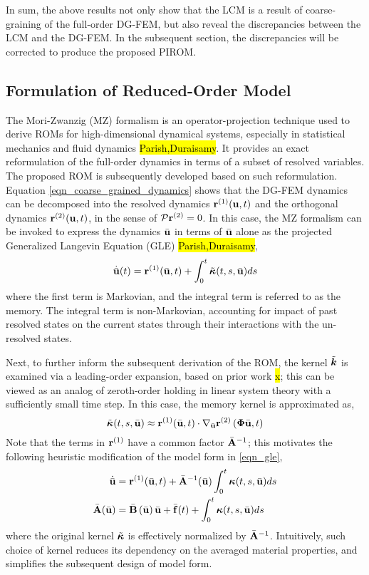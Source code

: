 In sum, the above results not only show that the LCM is a result of coarse-graining of the full-order DG-FEM, but also reveal the discrepancies between the LCM and the DG-FEM. In the subsequent section, the discrepancies will be corrected to produce the proposed PIROM.

\subsection{Formulation of Reduced-Order Model}

The Mori-Zwanzig (MZ) formalism is an operator-projection technique used to derive ROMs for high-dimensional dynamical systems, especially in statistical mechanics and fluid dynamics \hl{Parish,Duraisamy}. It provides an exact reformulation of the full-order dynamics in terms of a subset of resolved variables. The proposed ROM is subsequently developed based on such reformulation. Equation \cref{eqn_coarse_grained_dynamics} shows that the DG-FEM dynamics can be decomposed into the resolved dynamics $\mathbf{r}^{(1)}(\mathbf{u},t)$ and the orthogonal dynamics $\mathbf{r}^{(2)}(\mathbf{u},t)$, in the sense of $\mathcal{P}\mathbf{r}^{(2)}=0$. In this case, the MZ formalism can be invoked to express the dynamics $\bar{\mathbf{u}}$ in terms of $\bar{\mathbf{u}}$ alone as the projected Generalized Langevin Equation (GLE) \hl{Parish,Duraisamy},
\begin{equation}
    \dot{\bar{\mathbf{u}}}(t) = \mathbf{r}^{(1)}(\bar{\mathbf{u}},t) + \int_{0}^{t}\tilde{\boldsymbol{\kappa}}(t,s,\bar{\mathbf{u}})ds\label{eqn_gle}
\end{equation}
where the first term is Markovian, and the integral term is referred to as the memory. The integral term is non-Markovian, accounting for impact of past resolved states on the current states through their interactions with the un-resolved states.

Next, to further inform the subsequent derivation of the ROM, the kernel $\tilde{\boldsymbol{k}}$ is examined via a leading-order expansion, based on prior work \hl{x}; this can be viewed as an analog of zeroth-order holding in linear system theory with a sufficiently small time step. In this case, the memory kernel is approximated as,
\begin{equation}
    \tilde{\boldsymbol{\kappa}}(t,s,\bar{\mathbf{u}}) \approx \mathbf{r}^{(1)}(\bar{\mathbf{u}},t) \cdot \nabla_{\bar{\mathbf{u}}}\mathbf{r}^{(2)}\left(\boldsymbol{\Phi}\bar{\mathbf{u}},t\right)
\end{equation}
Note that the terms in $\mathbf{r}^{(1)}$ have a common factor $\bar{\mathbf{A}}^{-1}$; this motivates the following heuristic modification of the model form in \cref{eqn_gle},
\begin{subequations}
    \begin{align}
        \dot{\bar{\mathbf{u}}} &= \mathbf{r}^{(1)}(\bar{\mathbf{u}},t) + \bar{\mathbf{A}}^{-1}(\bar{\mathbf{u}})\int_{0}^{t}\boldsymbol{\kappa}(t,s,\bar{\mathbf{u}})ds\label{eqn_pirom_gle}\\
        \bar{\mathbf{A}}(\bar{\mathbf{u}}) &= \bar{\mathbf{B}}\left(\bar{\mathbf{u}}\right)\bar{\mathbf{u}} + \bar{\mathbf{f}}(t) + \int_{0}^{t}\boldsymbol{\kappa}(t,s,\bar{\mathbf{u}})ds\label{eqn_lcm_gle}
    \end{align}
\end{subequations}
where the original kernel $\tilde{\boldsymbol{\kappa}}$ is effectively normalized by $\bar{\mathbf{A}}^{-1}$. Intuitively, such choice of kernel reduces its dependency on the averaged material properties, and simplifies the subsequent design of model form.

